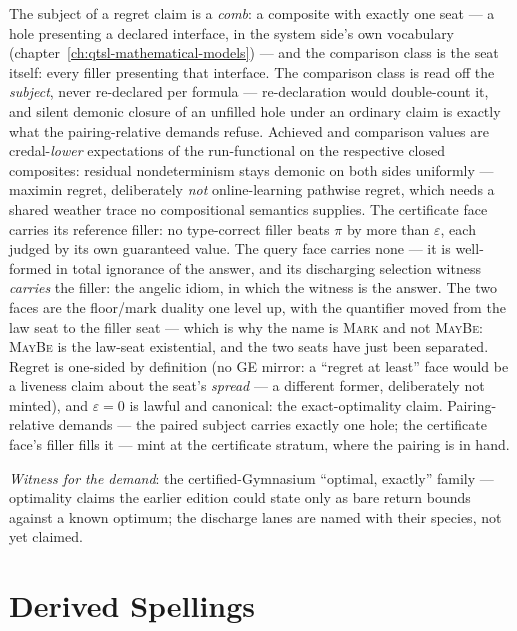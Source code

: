 The subject of a regret claim is a \emph{comb}: a composite with
exactly one seat --- a hole presenting a declared interface, in the
system side's own vocabulary
(chapter~\ref{ch:qtsl-mathematical-models}) --- and the comparison
class is the seat itself: every filler presenting that interface.
The comparison class is read off the \emph{subject}, never
re-declared per formula --- re-declaration would double-count it,
and silent demonic closure of an unfilled hole under an ordinary
claim is exactly what the pairing-relative demands refuse. Achieved
and comparison values are credal-\emph{lower} expectations of the
run-functional on the respective closed composites: residual
nondeterminism stays demonic on both sides uniformly --- maximin
regret, deliberately \emph{not} online-learning pathwise regret,
which needs a shared weather trace no compositional semantics
supplies. The certificate face carries its reference filler: no
type-correct filler beats $\pi$ by more than $\varepsilon$, each
judged by its own guaranteed value. The query face carries none ---
it is well-formed in total ignorance of the answer, and its
discharging selection witness \emph{carries} the filler: the
angelic idiom, in which the witness is the answer. The two faces
are the floor/mark duality one level up, with the quantifier moved
from the law seat to the filler seat --- which is why the name is
\textsc{Mark} and not \textsc{MayBe}: \textsc{MayBe} is the
law-seat existential, and the two seats have just been separated.
Regret is one-sided by definition (no GE mirror: a
``regret at least'' face would be a liveness claim about the seat's
\emph{spread} --- a different former, deliberately not minted), and
$\varepsilon = 0$ is lawful and canonical: the exact-optimality
claim. Pairing-relative demands --- the paired subject carries
exactly one hole; the certificate face's filler fills it --- mint
at the certificate stratum, where the pairing is in hand.

\emph{Witness for the demand}: the certified-Gymnasium
``optimal, exactly'' family --- optimality claims the earlier
edition could state only as bare return bounds against a known
optimum; the discharge lanes are named with their species, not yet
claimed.



\section{Derived Spellings}
\label{sec:spec-lang-derived}

